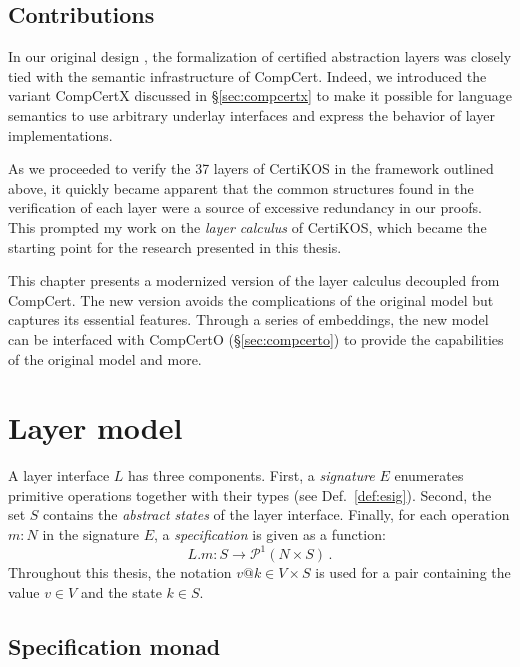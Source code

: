 \documentclass[11pt,oneside,draft]{book}
\theoremstyle{definition}
\begin{document}

\subsection{Contributions} %

In our original design \citep{popl15},
the formalization of certified abstraction layers
was closely tied with
the semantic infrastructure of CompCert.
Indeed,
we introduced the variant CompCertX discussed in \S\ref{sec:compcertx}
to make it possible for language semantics
to use arbitrary underlay interfaces and
express the behavior of layer implementations.

As we proceeded to verify the 37 layers of CertiKOS
in the framework outlined above,
it quickly became apparent that
the common structures found in the verification of each layer
were a source of excessive redundancy in our proofs.
This prompted my work on the \emph{layer calculus} of CertiKOS,
which became the starting point for the research
presented in this thesis.

This chapter
presents a modernized version of the layer calculus
decoupled from CompCert.
The new version avoids the complications of the original model
but captures its essential features.
Through a series of embeddings,
the new model can be interfaced with
CompCertO (\S\ref{sec:compcerto})
to provide the capabilities of the original model
and more.



\section{Layer model} %

A layer interface $L$ has three components.
First, a \emph{signature} $E$ enumerates
primitive operations together with their types
(see Def.~\ref{def:esig}).
Second,
the set $S$ contains the \emph{abstract states} of the layer interface.
Finally, for each operation $m \mathbin: N$ in the signature $E$,
a \emph{specification}
is given as a function:
\[
  L.m : S \rightarrow \mathcal{P}^1( N \times S) \,.
\]
Throughout this thesis,
the notation $v@k \in V \times S$ is used for a pair
containing the value $v \in V$ and the state $k \in S$.

\subsection{Specification monad} %
\end{document}
